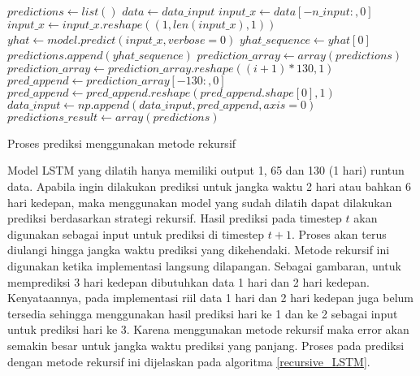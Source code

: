 \documentclass[../thesis.tex]{subfiles}
\begin{document}
\begin{algorithm}[htp]
	\begin{algorithmic}[1]
		\State $predictions \leftarrow list()$
			\State $data \leftarrow data\_input$
			\State $input\_x \leftarrow data[-n\_input:,0]$
			\State $input\_x \leftarrow input\_x.reshape((1, len(input\_x), 1))$
			\State $yhat \leftarrow model.predict(input\_x, verbose=0)$
			\State $yhat\_sequence \leftarrow yhat[0]$
			\State $predictions.append(yhat\_sequence)$
			\State $prediction\_array \leftarrow array(predictions)$
			\State $prediction\_array \leftarrow prediction\_array.reshape((i+1)*130, 1)$
			\State $pred\_append \leftarrow prediction\_array[-130:,0]$
			\State $pred\_append \leftarrow pred\_append.reshape(pred\_append.shape[0], 1)$
			\State $data\_input \leftarrow np.append(data\_input, pred\_append, axis=0)$
		\EndFor
		\State $predictions\_result \leftarrow array(predictions)$
	\EndFunction
	\end{algorithmic}
	\caption{Proses prediksi menggunakan metode rekursif}
	\label{recursive_LSTM}
\end{algorithm}
Model LSTM yang dilatih hanya memiliki output 1, 65 dan 130 (1 hari) runtun data. Apabila ingin dilakukan prediksi untuk jangka waktu 2 hari atau bahkan 6 hari kedepan, maka menggunakan model yang sudah dilatih dapat dilakukan prediksi berdasarkan strategi rekursif.
Hasil prediksi pada timestep $t$ akan digunakan sebagai input untuk prediksi di timestep $t+1$. Proses akan terus diulangi hingga jangka waktu prediksi yang dikehendaki. Metode rekursif ini digunakan ketika implementasi langsung dilapangan.
Sebagai gambaran, untuk memprediksi 3 hari kedepan dibutuhkan data 1 hari dan 2 hari kedepan. Kenyataannya, pada implementasi riil data 1 hari dan 2 hari kedepan juga belum tersedia sehingga menggunakan hasil prediksi hari ke 1 dan ke 2 sebagai input untuk prediksi hari ke 3.
Karena menggunakan metode rekursif maka error akan semakin besar untuk jangka waktu prediksi yang panjang.
Proses pada prediksi dengan metode rekursif ini dijelaskan pada algoritma \ref{recursive_LSTM}.
\end{document}
